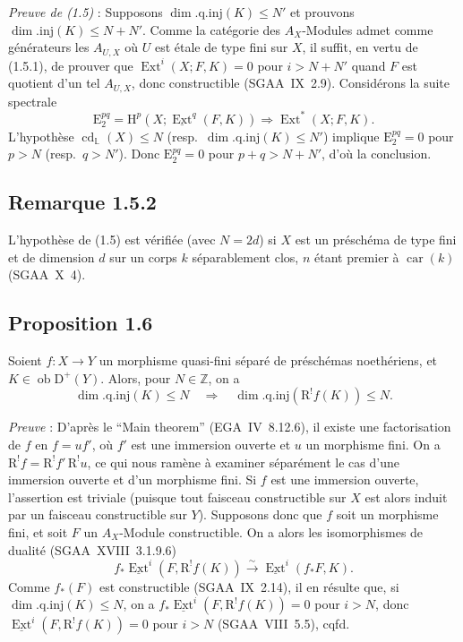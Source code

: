 \documentclass[11pt]{article}
\renewcommand{\H}{\mathrm{H}}
\DeclareMathOperator{\Ext}{Ext}
\DeclareMathOperator{\cd}{cd}
\newcommand{\R}{\mathrm{R}}\newcommand{\RHomCore}{\mathrm{RHom}}
\newcommand{\D}{\mathrm{D}}
\newcommand{\Z}{\mathbb{Z}}
\newcommand{\E}{\mathrm{E}}
\newcommand{\ob}{\operatorname{ob}}
\newcommand{\car}{\operatorname{car}}
\providecommand{\car}{\operatorname{car}}
\providecommand{\ob}{\operatorname{ob}}
\providecommand{\car}{\operatorname{car}}
\providecommand{\R}{\mathrm R}
\providecommand{\Z}{\mathbb Z}
\providecommand{\car}{\operatorname{car}}
\begin{document}
\emph{Preuve de (1.5)} : Supposons $\dim.\mathrm{q.inj}(K) \leqslant N'$ et prouvons $\dim.\mathrm{inj}(K) \leqslant N + N'$. Comme la catégorie des $A_X$-Modules admet comme générateurs les $A_{U,X}$ où $U$ est étale de type fini sur $X$, il suffit, en vertu de (1.5.1), de prouver que $\Ext^i(X; F,K) = 0$ pour $i > N + N'$ quand $F$ est quotient d'un tel $A_{U,X}$, donc constructible (SGAA~IX~2.9). Considérons la suite spectrale
\[
\E_2^{pq} = \H^p(X; \underline{\Ext}^q(F,K)) \Rightarrow \Ext^{*}(X; F,K).
\]
L'hypothèse $\cd_{\mathbb{L}}(X) \leqslant N$ (resp.~$\dim.\mathrm{q.inj}(K) \leqslant N'$) implique $\E_2^{pq} = 0$ pour $p > N$ (resp.~$q > N'$). Donc $\E_2^{pq} = 0$ pour $p+q > N+N'$, d'où la conclusion.

\subsection*{Remarque 1.5.2}
L'hypothèse de (1.5) est vérifiée (avec $N = 2d$) si $X$ est un préschéma de type fini et de dimension $d$ sur un corps $k$ séparablement clos, $n$ étant premier à $\car(k)$ (SGAA~X~4).

\subsection*{Proposition 1.6}
Soient $f : X \to Y$ un morphisme quasi-fini séparé de préschémas noethériens, et $K \in \ob \D^{+}(Y)$. Alors, pour $N \in \Z$, on a
\[
\dim.\mathrm{q.inj}(K) \leqslant N \quad \Longrightarrow \quad \dim.\mathrm{q.inj}(\R^{!}f(K)) \leqslant N.
\]

\emph{Preuve} : D'après le ``Main theorem'' (EGA~IV~8.12.6), il existe une factorisation de $f$ en $f = uf'$, où $f'$ est une immersion ouverte et $u$ un morphisme fini. On a $\R^{!}f = \R^{!}f' \, \R^{!}u$, ce qui nous ramène à examiner séparément le cas d'une immersion ouverte et d'un morphisme fini. Si $f$ est une immersion ouverte, l'assertion est triviale (puisque tout faisceau constructible sur $X$ est alors induit par un faisceau constructible sur $Y$). Supposons donc que $f$ soit un morphisme fini, et soit $F$ un $A_X$-Module constructible. On a alors les isomorphismes de dualité (SGAA~XVIII~3.1.9.6)
\[
f_{*}\underline{\Ext}^i(F, \R^{!}f(K)) \xrightarrow{\sim} \underline{\Ext}^i(f_{*}F, K).
\]
Comme $f_{*}(F)$ est constructible (SGAA~IX~2.14), il en résulte que, si $\dim.\mathrm{q.inj}(K) \leqslant N$, on a $f_{*}\underline{\Ext}^i(F, \R^{!}f(K)) = 0$ pour $i > N$, donc $\underline{\Ext}^i(F, \R^{!}f(K)) = 0$ pour $i > N$ (SGAA~VIII~5.5), cqfd.
\end{document}
